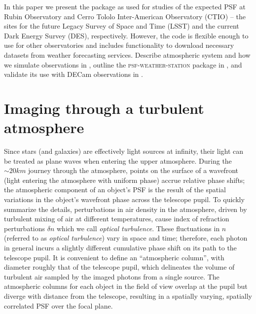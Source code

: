 \documentclass[twocolumn]{aastex631}
\newcommand{\psfws}{\textsc{psf-weather-station}\xspace}
\begin{document}
In this paper we present the package as used for studies of the expected PSF at Rubin Observatory and Cerro Tololo Inter-American Observatory (CTIO) -- the sites for the future Legacy Survey of Space and Time (LSST) and the current Dark Energy Survey (DES), respectively. 
However, the code is flexible enough to use for other observatories and includes functionality to download necessary datasets from weather forecasting services.
Describe atmospheric system and how we simulate observations in , outline the \psfws package in , and validate its use with DECam observations in .


\section{Imaging through a turbulent atmosphere} \label{sec:atmos}
Since stars (and galaxies) are effectively light sources at infinity, their light can be treated as plane waves when entering the upper atmosphere. 
During the $\sim20\unit{km}$ journey through the atmosphere, points on the surface of a wavefront (light entering the atmosphere with uniform phase) accrue relative phase shifts; the atmospheric component of an object's PSF is the result of the spatial variations in the object's wavefront phase across the telescope pupil.
To quickly summarize the details, perturbations in air density in the atmosphere, driven by turbulent mixing of air at different temperatures, cause index of refraction perturbations $\delta n$ \citep{lawrence_survey_1970, clifford_classical_1978} which we call \textit{optical turbulence}.
These fluctuations in $n$ (referred to as \textit{optical turbulence}) vary in space and time; therefore, each photon in general incurs a slightly different cumulative phase shift on its path to the telescope pupil.
It is convenient to define an ``atmospheric column'', with diameter roughly that of the telescope pupil, which delineates the volume of turbulent air sampled by the imaged photons from a single source. 
The atmospheric columns for each object in the field of view overlap at the pupil but diverge with distance from the telescope, resulting in a spatially varying, spatially correlated PSF over the focal plane. 
\end{document}
